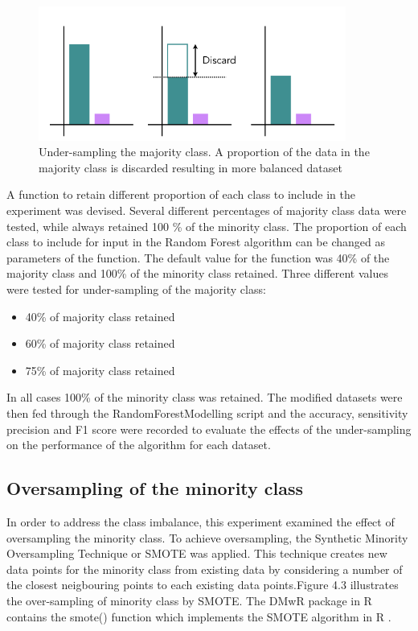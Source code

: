 \begin{figure}[!htbp]
    \centering
    \includegraphics[width=0.9\textwidth]{ThesisTemplate/usingLatex/chapter4Images/Figure2001.png}
    \caption{Under-sampling the majority class. A proportion of the data in the majority class is discarded resulting in more balanced dataset}
    \label{fig:UnderSampling}
\end{figure}


A function to retain different proportion of each class to include in the experiment was devised. Several different percentages of majority class data were tested, while always retained 100 \% of the minority class.
The proportion of each class to include for input in the Random Forest algorithm can be changed as parameters of the function.
The default value for the function was 40\% of the majority class and 100\% of the minority class retained.\newline
Three different values were tested for under-sampling of the majority class:
\begin{itemize}
    \item 40\% of majority class retained
    \item 60\% of majority class retained
    \item 75\% of majority class retained
\end{itemize}

In all cases 100\% of the minority class was retained.\newline
The modified datasets were then fed through the RandomForestModelling script and the accuracy, sensitivity precision and F1 score were recorded to evaluate the effects of the under-sampling on the performance of the algorithm for each dataset.\newline



\subsection{Oversampling of the minority class}
In order to address the class imbalance, this experiment examined the effect of oversampling the minority class. To achieve oversampling, the Synthetic Minority Oversampling Technique or SMOTE \citep{Chawla:2002ty} was applied. \newline 
This technique creates new data points for the minority class from existing data by considering a number of the closest neigbouring points to each existing data points.Figure 4.3 illustrates the over-sampling of minority class by SMOTE. The DMwR package in R contains the smote() function which implements the SMOTE algorithm in R \citep{Anonymous:bPzTqa7x}.\newline

